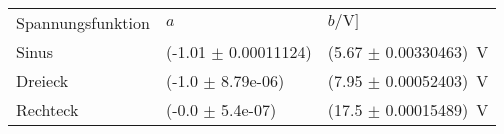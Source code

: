 \begin{tabular}{lll}
\hline
 Spannungsfunktion & $a$                      & $b/\si{\volt}]$                     \\
 Sinus             & (-1.01 $\pm$ 0.00011124) & (5.67 $\pm$ 0.00330463)\ \si{\volt} \\
 Dreieck           & (-1.0 $\pm$ 8.79e-06)    & (7.95 $\pm$ 0.00052403)\ \si{\volt} \\
 Rechteck          & (-0.0 $\pm$ 5.4e-07)     & (17.5 $\pm$ 0.00015489)\ \si{\volt} \\
\hline
\end{tabular}